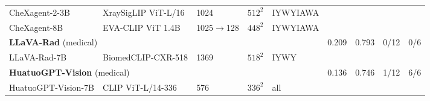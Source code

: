 \begin{table}[tp]
{\begin{tabular}{lllll@{\hspace{8pt}}rrrr}
\quad CheXagent-2-3B & XraySigLIP ViT-L/16 & 1024 & $512^2$ & IYWYIAWA & & & & \\
\quad CheXagent-8B & EVA-CLIP ViT 1.4B & 1025$\to$128 & $448^2$ & IYWYIAWA & & & & \\
\midrule
\multicolumn{5}{l}{\textbf{LLaVA-Rad} (medical)~\citep{zambranochaves2025llavarad}} & 0.209 & 0.793 & \cellcolor{cfTerra1}0/12 & \cellcolor{cfTerra1}0/6 \\
\quad LLaVA-Rad-7B & BiomedCLIP-CXR-518 & 1369 & $518^2$ & IYWY & & & & \\
\midrule
\multicolumn{5}{l}{\textbf{HuatuoGPT-Vision} (medical)~\citep{chen2024huatuogptvision}} & 0.136 & 0.746 & \cellcolor{cfTerra2}1/12 & \cellcolor{cfTerra4}6/6 \\
\quad HuatuoGPT-Vision-7B & CLIP ViT-L/14-336 & 576 & $336^2$ & all & & & & \\
\bottomrule
\end{tabular}}
\end{table}
